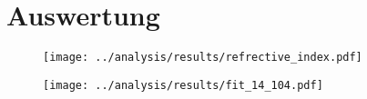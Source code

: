 \section{Auswertung}


\begin{figure}
  \centering
  \texttt{[image: ../analysis/results/refrective\_index.pdf]}
  \caption{\cite{ref_index_au}}
  \label{}
\end{figure}


\begin{figure}
  \centering
  \texttt{[image: ../analysis/results/fit\_14\_104.pdf]}
  \caption{}
  \label{}
\end{figure}
